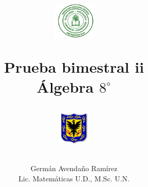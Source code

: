 \documentclass[10pt,letterpaper,addpoints]{exam}
\begin{document}
\title{\begin{minipage}{.2\textwidth}
        \includegraphics[height=1.75cm]{Images/logo-colegio.png}
       \end{minipage}
\begin{minipage}{.55\textwidth}
 \begin{center}
Prueba bimestral ii\\Álgebra $8^{\circ}$
\end{center}
\end{minipage}
\begin{minipage}{.2\textwidth}
\includegraphics[height=1.75cm]{Images/logo-sed.png} 
\end{minipage}
}
\author{Germ\'{a}n Avendaño Ram\'{i}rez\\Lic. Matemáticas U.D., M.Sc. U.N.}
\date{}
\maketitle
\begin{center}
\end{center}
\vspace{0.1in}
\end{document}
